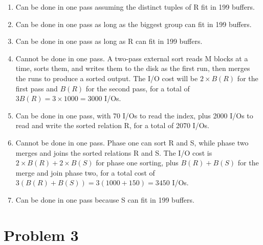 \documentclass[a4paper, 12pt]{article}
\begin{document}
\begin{enumerate}[label=(\alph*)]
	\item Can be done in one pass assuming the distinct tuples of R fit in 199
		buffers.
	\item Can be done in one pass as long as the biggest group can fit in 199
		buffers.
	\item Can be done in one pass as long as R can fit in 199 buffers.
	\item Cannot be done in one pass. A two-pass external sort reads M blocks at
		a time, sorts them, and writes them to the disk as the first run, then
		merges the runs to produce a sorted output. The I/O cost will be $ 2
		\times B(R) $ for the first pass and $ B(R) $ for the second pass, for a
		total of $ 3 B(R) = 3 \times 1000 = 3000 $ I/Os.
	\item Can be done in one pass, with 70 I/Os to read the index, plus 2000
		I/Os to read and write the sorted relation R, for a total of 2070 I/Os.
	\item Cannot be done in one pass. Phase one can sort R and S, while phase
		two merges and joins the sorted relations R and S. The I/O cost is $ 2
		\times B(R) + 2 \times B(S) $ for phase one sorting, plus $ B(R) + B(S)
		$ for the merge and join phase two, for a total cost of $ 3 ( B(R) +
		B(S)) = 3 ( 1000 + 150 ) = 3450 $ I/Os.
	\item Can be done in one pass because S can fit in 199 buffers.
\end{enumerate}

\section*{Problem 3}
\end{document}

